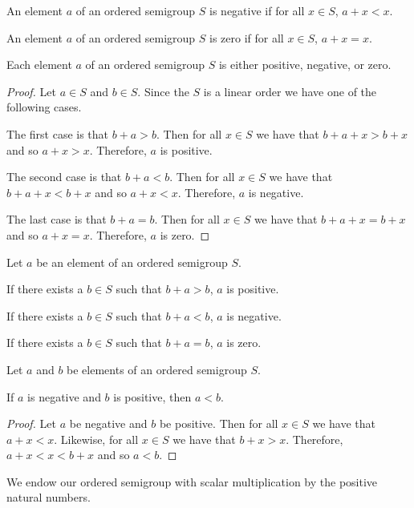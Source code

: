 \begin{definition}
An element $a$ of an ordered semigroup $S$
is negative if for all $x\in S$, $a+x < x$.
\end{definition}

\begin{definition}
An element $a$ of an ordered semigroup $S$
is zero if for all $x\in S$, $a+x = x$.
\end{definition}

\begin{theorem}
Each element $a$ of an ordered semigroup $S$ is either positive, negative, or zero.
\end{theorem}
\begin{proof}
Let $a\in S$ and $b\in S$. Since the $S$ is a linear order we have one of the following cases.

The first case is that $b + a > b$. Then for all $x\in S$ we have that $b + a + x > b + x$
and so $a + x > x$. Therefore, $a$ is positive.

The second case is that $b + a < b$. Then for all $x\in S$ we have that $b + a + x < b + x$
and so $a + x < x$. Therefore, $a$ is negative.

The last case is that $b + a = b$. Then for all $x\in S$ we have that $b + a + x = b + x$
and so $a + x = x$. Therefore, $a$ is zero.
\end{proof}

\begin{corollary}
Let $a$ be an element of an ordered semigroup $S$. 

If there exists a $b\in S$ such that $b + a > b$, $a$ is positive.

If there exists a $b\in S$ such that $b + a < b$, $a$ is negative.

If there exists a $b\in S$ such that $b + a = b$, $a$ is zero.
\end{corollary}

\begin{theorem}
Let $a$ and $b$ be elements of an ordered semigroup $S$.

If $a$ is negative and $b$ is positive, then $a < b$.
\end{theorem}
\begin{proof}
Let $a$ be negative and $b$ be positive. Then for all $x\in S$ we have that $a + x < x$.
Likewise, for all $x\in S$ we have that $b + x > x$.
Therefore, $a + x < x < b + x$ and so $a < b$.
\end{proof}

We endow our ordered semigroup with scalar multiplication by the positive natural numbers.

